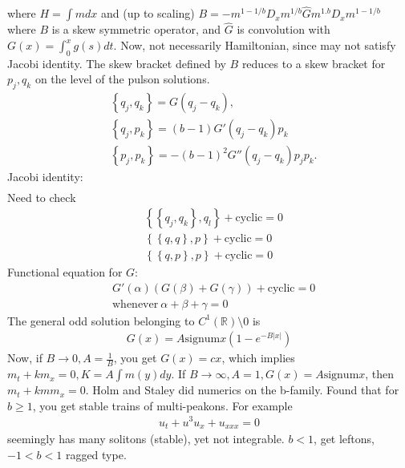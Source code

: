 \documentclass[12pt,reqno]{amsart}
\numberwithin{equation}{section}  %
\newcommand{\rr}{\mathbb{R}}
\newcommand{\wh}{\widehat}
\begin{document}
%
%
where $H = \int m dx$ and (up to scaling)
$B = -m^{1 - 1/b} D_{x} m^{1/b} \wh{G} m^{1.b}
D_{x} m^{1 - 1/b}$ where $B$ is a skew symmetric operator, and $\wh{G}$ is
convolution with $G(x) = \int_{0}^{x} g(s) dt$. 
Now, not necessarily Hamiltonian, since may not satisfy Jacobi identity.        
The skew bracket defined by $B$ reduces to a skew bracket for $p_{j},
q_{k}$ on the level of the pulson solutions.
%
%
\begin{equation*}
\begin{split}
  & \left\{ q_{j}, q_{k} \right\} = G(q_{j} - q_{k}),
  \\
  & \left\{ q_{j}, p_{k} \right\} = (b-1) G'(q_{j} - q_{k})p_{k}
  \\
  & \left\{ p_{j}, p_{k} \right\} = -(b-1)^{2} G''(q_{j} - q_{k})p_{j}
  p_{k}.
\end{split}
\end{equation*}
%
%
Jacobi identity:
%
%
\begin{equation*}
\begin{split}
\end{split}
\end{equation*}
%
%
Need to check 
%
%
\begin{equation*}
\begin{split}
  & \left\{ \left\{ q_{j}, q_{k} \right\}, q_{l} \right\} + \text{cyclic} = 0
  \\
  & \left\{ \left\{ q, q \right\}, p \right\} + \text{cyclic} = 0
  \\
  & \left\{ \left\{ q, p \right\}, p \right\} + \text{cyclic} = 0
\end{split}
\end{equation*}
%
%
Functional equation for $G$:
%
%
\begin{equation*}
\begin{split}
  & G'(\alpha)(G(\beta) + G(\gamma)) + \text{cyclic} = 0
  \\
  &  \text{whenever} \ \alpha + \beta + \gamma =0
\end{split}
\end{equation*}
%
%
The general odd solution belonging to $C^{1}(\rr)\setminus 0$ is
%
%
\begin{equation*}
\begin{split}
  G(x) = A \text{signum} x(1 - e^{-B| x |})
\end{split}
\end{equation*}
%
%
Now, if $B \to 0, A = \frac{1}{B}$, you get $G(x) = cx$, which implies
$m_{t} + k m_{x} = 0, K = A \int m(y) dy$. If $B \to \infty, A=1, G(x) = A
\text{signum} x$, then $m_{t} + kmm_{x}=0$. Holm and Staley did numerics on the
b-family. Found that for $b \ge 1$, you get stable trains of multi-peakons. For
example
%
%
\begin{equation*}
\begin{split}
  u_{t} + u^{3} u_{x} + u_{xxx} = 0
\end{split}
\end{equation*}
%
%
seemingly has many solitons (stable), yet not integrable. $b < 1$, get leftons,
$-1 < b < 1$ ragged type.
\end{document}
